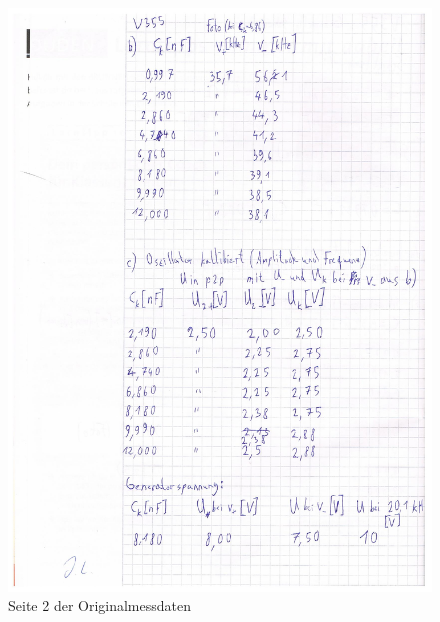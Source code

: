 \begin{figure}
    \centering
    \includegraphics[width=\textwidth]{images/originaldaten_2.png}
    \caption{Seite 2 der Originalmessdaten}
    \label{fig:originaldaten_2}
\end{figure}


